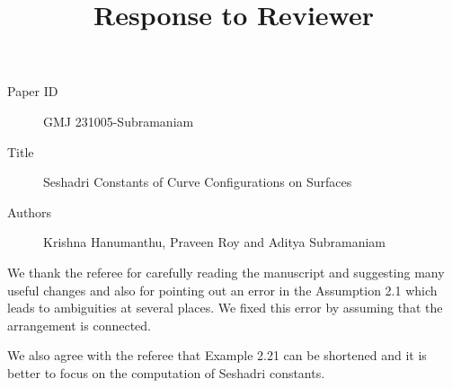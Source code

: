 \documentclass[12pt,twoside,reqno]{amsart}
\numberwithin{equation}{section}
\theoremstyle{definition}
\begin{document}
\title{Response to Reviewer}
\begin{description}
\item[Paper ID]  GMJ 231005-Subramaniam

\item [Title] Seshadri Constants of Curve Configurations on Surfaces
\item [Authors] Krishna Hanumanthu, Praveen Roy and Aditya Subramaniam
\end{description}

We thank the referee for carefully reading the manuscript and suggesting 
many useful changes and also for pointing out an error in the Assumption 2.1 which leads to 
ambiguities at several places. We fixed this error by assuming that the arrangement is connected. 

We also agree with the referee that Example 2.21 can be shortened and it is better to 
focus on the computation of Seshadri constants. 
\end{document}
